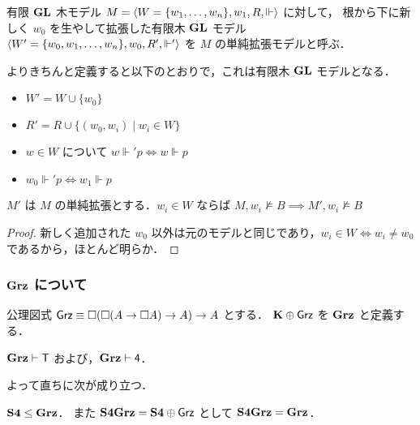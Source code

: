 \documentclass{jlreq}
\begin{document}
\begin{definition}
	有限 $\mathbf{GL}$ 木モデル $M = \langle W = \{w_1,\dots,w_n\}, w_1, R, \Vdash \rangle$ に対して，
	根から下に新しく $w_0$ を生やして拡張した有限木 $\mathbf{GL}$ モデル $\langle W' = \{w_0,w_1,\dots,w_n\}, w_0, R', \Vdash' \rangle$ を $M$ の単純拡張モデルと呼ぶ．

	よりきちんと定義すると以下のとおりで，これは有限木 $\mathbf{GL}$ モデルとなる．
	\begin{itemize}
		\item $W' = W \cup \{w_0\}$
		\item $R' = R \cup \{(w_0,w_i) \mid w_i \in W\}$
		\item $w \in W$ について $w \Vdash' p \iff w \Vdash p$
		\item $w_0 \Vdash' p \iff w_1 \Vdash p$
	\end{itemize}
\end{definition}

\begin{lemma}\label{lem:simple_extension}
	$M'$ は $M$ の単純拡張とする．$w_i \in W$ ならば $M,w_i \nvDash B \implies M',w_i \nvDash B$
\end{lemma}
\begin{proof}
	新しく追加された $w_0$ 以外は元のモデルと同じであり，$w_i \in W \iff w_i \neq w_0$ であるから，ほとんど明らか．

\end{proof}

\subsubsection{$\LogicGrz$ について}

\begin{definition}
	公理図式 $\mathsf{Grz} \equiv \Box(\Box(A \to \Box A) \to A) \to A$ \index{$\AxGrz$} とする．
	$\mathbf{K} \oplus \mathsf{Grz}$ を $\LogicGrz$ と定義する．\index{$\LogicGrz$}
\end{definition}

\begin{lemma}
	$\mathbf{Grz} \vdash \mathsf{T}$ および，$\mathbf{Grz} \vdash \mathsf{4}$．
\end{lemma}

よって直ちに次が成り立つ．

\begin{corollary}\label{cor:S4_weakerThan_Grz}
	$\mathbf{S4} \leq \mathbf{Grz}$．
	また $\mathbf{S4Grz} = \mathbf{S4} \oplus \mathsf{Grz}$ として $\mathbf{S4Grz} = \mathbf{Grz}$．
\end{corollary}
\end{document}
